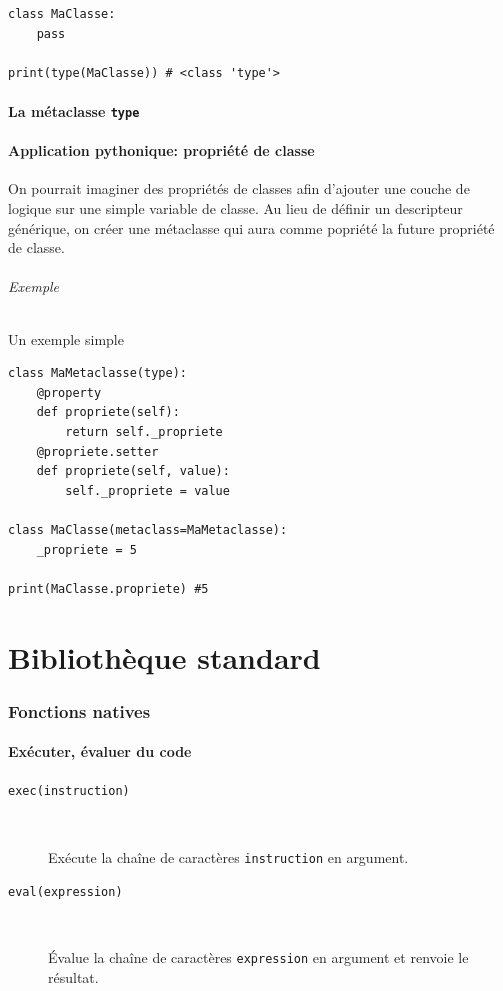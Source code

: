 \documentclass[a4paper, 10pt]{article}
\begin{document}
\begin{verbatim}
class MaClasse:
    pass

print(type(MaClasse)) # <class 'type'>
\end{verbatim}

\subsection{La métaclasse \texttt{type}}



\subsection{Application pythonique: propriété de classe}
On pourrait imaginer des propriétés de classes afin d'ajouter une couche de logique sur une simple variable de classe. Au lieu de définir un descripteur générique, on créer une métaclasse qui aura comme popriété la future propriété de classe.

\paragraph{Exemple} Un exemple simple
\begin{verbatim}
class MaMetaclasse(type):
    @property
    def propriete(self):
        return self._propriete
    @propriete.setter
    def propriete(self, value):
        self._propriete = value

class MaClasse(metaclass=MaMetaclasse):
    _propriete = 5

print(MaClasse.propriete) #5
\end{verbatim}

\newpage

\part{Bibliothèque standard}
\section{Fonctions natives}
\subsection{Exécuter, évaluer du code}
\begin{description}
    \item[\texttt{exec(instruction)}]~
    
    Exécute la chaîne de caractères \texttt{instruction} en argument.

    \item[\texttt{eval(expression)}]~

    Évalue la chaîne de caractères \texttt{expression} en argument et renvoie le résultat.
\end{description}
\end{document}
